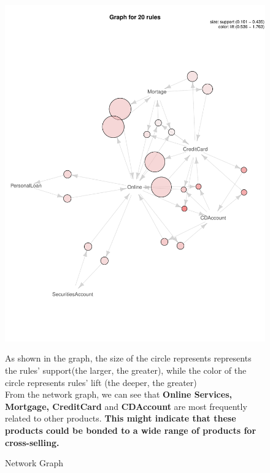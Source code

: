 \documentclass[]{article}
\begin{document}
\begin{figure}[H]
	\centering
	\begin{minipage}{0.58\textwidth}
	\centering
		\includegraphics{tem_files/figure-latex/shopbasket-1.pdf}
		\caption{Network Graph}
	\end{minipage}
	\hspace{1cm}
	\begin{minipage}{0.28\textwidth}
As shown in the graph, the size of the circle represents represents the rules' support(the larger, the greater), while the color of the circle represents rules' lift (the deeper, the greater)\\
From the network graph, we can see that \textbf{Online Services, Mortgage, CreditCard} and \textbf{CDAccount} are most frequently related to other products. \textbf{This might indicate that these products could be bonded to a wide range of products for cross-selling.} 
	\end{minipage}
\end{figure}
\end{document}
